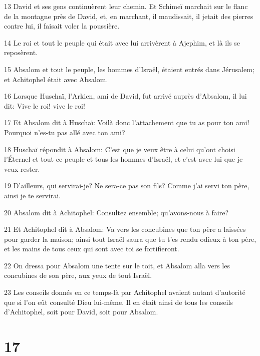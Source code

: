 \par 13 David et ses gens continuèrent leur chemin. Et Schimeï marchait sur le flanc de la montagne près de David, et, en marchant, il maudissait, il jetait des pierres contre lui, il faisait voler la poussière.
\par 14 Le roi et tout le peuple qui était avec lui arrivèrent à Ajephim, et là ils se reposèrent.
\par 15 Absalom et tout le peuple, les hommes d'Israël, étaient entrés dans Jérusalem; et Achitophel était avec Absalom.
\par 16 Lorsque Huschaï, l'Arkien, ami de David, fut arrivé auprès d'Absalom, il lui dit: Vive le roi! vive le roi!
\par 17 Et Absalom dit à Huschaï: Voilà donc l'attachement que tu as pour ton ami! Pourquoi n'es-tu pas allé avec ton ami?
\par 18 Huschaï répondit à Absalom: C'est que je veux être à celui qu'ont choisi l'Éternel et tout ce peuple et tous les hommes d'Israël, et c'est avec lui que je veux rester.
\par 19 D'ailleurs, qui servirai-je? Ne sera-ce pas son fils? Comme j'ai servi ton père, ainsi je te servirai.
\par 20 Absalom dit à Achitophel: Consultez ensemble; qu'avons-nous à faire?
\par 21 Et Achitophel dit à Absalom: Va vers les concubines que ton père a laissées pour garder la maison; ainsi tout Israël saura que tu t'es rendu odieux à ton père, et les mains de tous ceux qui sont avec toi se fortifieront.
\par 22 On dressa pour Absalom une tente sur le toit, et Absalom alla vers les concubines de son père, aux yeux de tout Israël.
\par 23 Les conseils donnés en ce temps-là par Achitophel avaient autant d'autorité que si l'on eût consulté Dieu lui-même. Il en était ainsi de tous les conseils d'Achitophel, soit pour David, soit pour Absalom.

\chapter{17}

